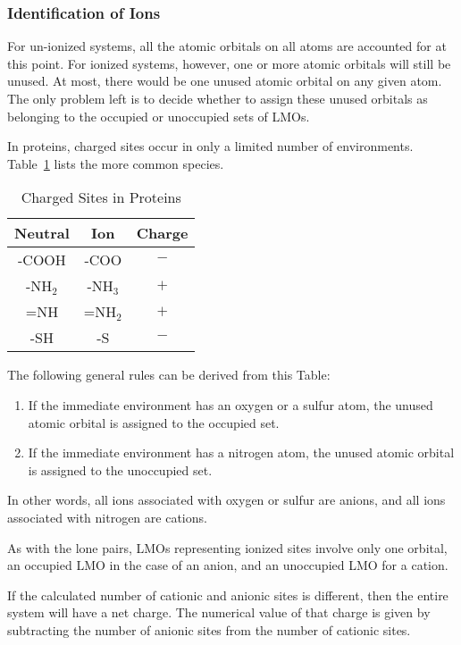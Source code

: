 \subsubsection{Identification of Ions} 

For un-ionized systems, all the atomic orbitals on all atoms are  accounted for
at this point.  For ionized systems, however, one or more atomic orbitals will
still be unused.  At most, there would be one unused atomic orbital on any
given atom.  The only problem left is to decide whether to assign  these unused
orbitals as belonging to the  occupied or unoccupied sets of LMOs.

In proteins, charged sites occur in only a limited number of environments.
Table~\ref{ions} lists the more common species.
\begin{table}
\caption{\label{ions} Charged Sites in Proteins}
\begin{center}
\begin{tabular}{ccc} \hline
Neutral  &   Ion      &   Charge \\ \hline
-COOH    &  -COO      &$-$ \\
-NH$_2$  &  -NH$_3$   &$+$ \\
=NH      &  =NH$_2$   &$+$ \\
-SH      &  -S        &$-$ \\
\hline
\end{tabular}
\end{center}
\end{table}
The following general rules can be derived from this Table:
\begin{enumerate}
\item If the immediate environment has an oxygen or a sulfur atom, the
unused atomic orbital is assigned to the occupied set.
\item If the immediate environment has a nitrogen atom,  the
unused atomic orbital is assigned to the unoccupied set. 
\end{enumerate}
In other words, all ions associated with oxygen or sulfur are anions, and
all ions associated with nitrogen are cations.  

As with the lone pairs, LMOs representing ionized sites involve only one
orbital, an occupied LMO in the case of an anion, and an unoccupied LMO for a
cation.

If the calculated number of cationic and anionic sites is different, then the
entire system will have a net charge.  The numerical value of that  charge is
given by subtracting the number of anionic sites from the number of cationic
sites.

